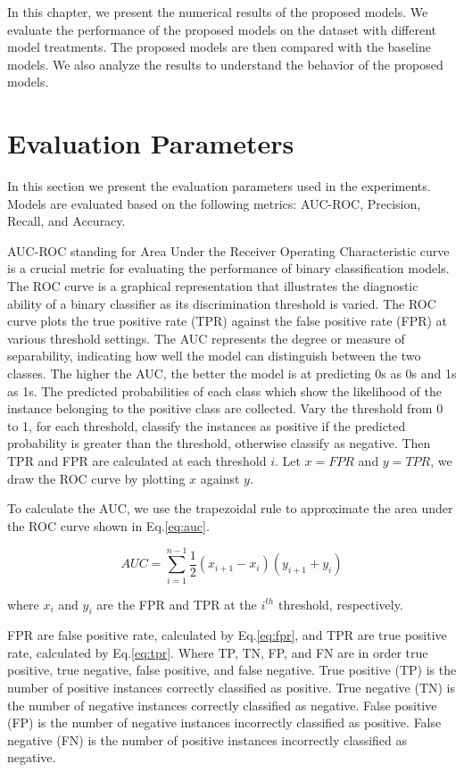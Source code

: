\documentclass[../main.tex]{subfiles}
\begin{document}

In this chapter, we present the numerical results of the proposed models.
We evaluate the performance of the proposed models on the dataset with different model treatments.
The proposed models are then compared with the baseline models.
We also analyze the results to understand the behavior of the proposed models.


\section{Evaluation Parameters}

In this section we present the evaluation parameters used in the experiments.
Models are evaluated based on the following metrics:
AUC-ROC, Precision, Recall, and Accuracy.


AUC-ROC standing for Area Under the Receiver Operating Characteristic curve is a crucial metric for evaluating the performance of binary classification models.
The \gls{ROC} curve is a graphical representation that illustrates the diagnostic ability of a binary classifier as its discrimination threshold is varied.
The \gls{ROC} curve plots the true positive rate (TPR) against the false positive rate (FPR) at various threshold settings.
The \gls{AUC} represents the degree or measure of separability, indicating how well the model can distinguish between the two classes.
The higher the AUC, the better the model is at predicting 0s as 0s and 1s as 1s.
The predicted probabilities of each class which show the likelihood of the instance belonging to the positive class are collected.
Vary the threshold from 0 to 1, for each threshold, classify the instances as positive if the predicted probability is greater than the threshold, otherwise classify as negative.
Then TPR and FPR are calculated at each threshold $i$.
Let $x = FPR$ and $y = TPR$, we draw the \gls{ROC} curve by plotting $x$ against $y$.

To calculate the AUC, we use the trapezoidal rule to approximate the area under the \gls{ROC} curve shown in Eq.\ref{eq:auc}.

\begin{equation}
    \label{eq:auc}
    AUC = \sum_{i=1}^{n-1} \frac{1}{2} (x_{i+1} - x_{i}) (y_{i+1} + y_{i})
\end{equation}

where $x_i$ and $y_i$ are the FPR and TPR at the $i^{th}$ threshold, respectively.

FPR are false positive rate, calculated by Eq.\ref{eq:fpr}, and TPR are true positive rate, calculated by Eq.\ref{eq:tpr}.
Where TP, TN, FP, and FN are in order true positive, true negative, false positive, and false negative.
True positive (TP) is the number of positive instances correctly classified as positive.
True negative (TN) is the number of negative instances correctly classified as negative.
False positive (FP) is the number of negative instances incorrectly classified as positive.
False negative (FN) is the number of positive instances incorrectly classified as negative.
\end{document}

